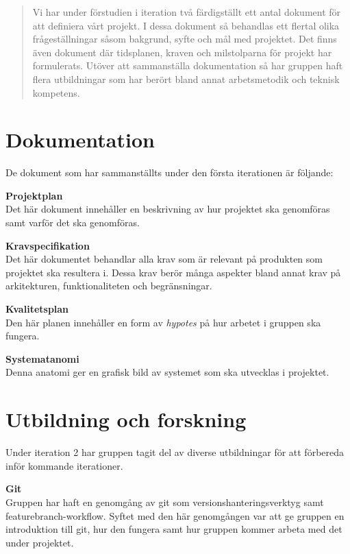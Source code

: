 \documentclass[a4paper,10pt]{article}
\begin{document}


\begin{abstract}
\noindent Vi har under förstudien i iteration två färdigställt ett antal dokument för att definiera vårt projekt. I dessa dokument så behandlas ett flertal olika frågeställningar såsom bakgrund, syfte och mål med projektet. Det finns även dokument där tidsplanen, kraven och milstolparna för projekt har formulerats. Utöver att sammanställa dokumentation så har gruppen haft flera utbildningar som har berört bland annat arbetsmetodik och teknisk kompetens.
\end{abstract}
\clearpage

\section{Dokumentation}
\label{sec:Dokumentation}
De dokument som har sammanställts under den första iterationen är följande:

\textbf{Projektplan}\\ Det här dokument innehåller en beskrivning av hur projektet ska genomföras samt varför det ska genomföras.

\textbf{Kravspecifikation}\\ Det här dokumentet behandlar alla krav som är relevant på produkten som projektet ska resultera i. Dessa krav berör många aspekter bland annat krav på arkitekturen, funktionaliteten och begränsningar.

\textbf{Kvalitetsplan}\\ Den här planen innehåller en form av \emph{hypotes} på hur arbetet i gruppen ska fungera.

\textbf{Systematanomi}\\ Denna anatomi ger en grafisk bild av systemet som ska utvecklas i projektet.

\section{Utbildning och forskning}
\label{sec:Utbildning och forskning}
Under iteration 2 har gruppen tagit del av diverse utbildningar för att förbereda inför kommande iterationer.

\textbf{Git}\\ Gruppen har haft en genomgång av git som versionshanteringsverktyg samt featurebranch-workflow. Syftet med den här genomgången var att ge gruppen en introduktion till git, hur den fungera samt hur gruppen kommer arbeta med det under projektet.
\end{document}
